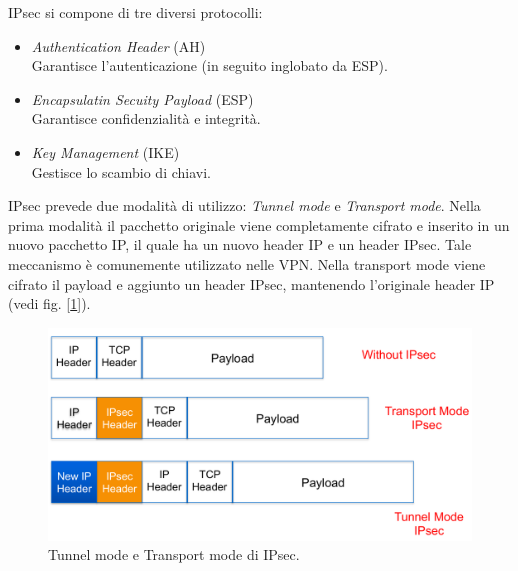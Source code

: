\documentclass[a4paper, 11pt, twoside, openright, fleqn]{report}
\begin{document}
\noindent
IPsec si compone di tre diversi protocolli:
\begin{itemize}
	\item \emph{Authentication Header} (AH)\\
	Garantisce l'autenticazione (in seguito inglobato da ESP).
	\item \emph{Encapsulatin Secuity Payload} (ESP)\\
	Garantisce confidenzialità e integrità.
	\item \emph{Key Management} (IKE)\\
	Gestisce lo scambio di chiavi.
\end{itemize}
IPsec prevede due modalità di utilizzo: \emph{Tunnel mode} e \emph{Transport mode}. Nella prima modalità il pacchetto originale viene completamente cifrato e inserito in un nuovo pacchetto IP, il quale ha un nuovo header IP e un header IPsec. Tale meccanismo è comunemente utilizzato nelle VPN. Nella transport mode viene cifrato il payload e aggiunto un header IPsec, mantenendo l'originale header IP (vedi fig. [\ref{fig:tunneltransport}]).
\begin{figure}[htp]
	\centering
	\includegraphics[width=.9\textwidth]{images/TunnelTransport}
	\caption{Tunnel mode e Transport mode di IPsec.}\label{fig:tunneltransport}
\end{figure}
\end{document}
